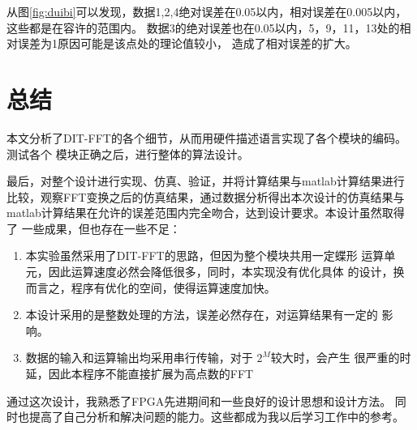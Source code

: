 从图\ref{fig:duibi}可以发现，数据1,2,4绝对误差在0.05以内，相对误差在0.005以内，这些都是在容许的范围内。
数据3的绝对误差也在0.05以内，5，9，11，13处的相对误差为1原因可能是该点处的理论值较小，
造成了相对误差的扩大。

\chapter{总结}

本文分析了DIT-FFT的各个细节，从而用硬件描述语言实现了各个模块的编码。测试各个
模块正确之后，进行整体的算法设计。

最后，对整个设计进行实现、仿真、验证，并将计算结果与matlab计算结果进行
比较，观察FFT变换之后的仿真结果，通过数据分析得出本次设计的仿真结果与
matlab计算结果在允许的误差范围内完全吻合，达到设计要求。本设计虽然取得了
一些成果，但也存在一些不足：
\begin{enumerate}
    \item 本实验虽然采用了DIT-FFT的思路，但因为整个模块共用一定蝶形
        运算单元，因此运算速度必然会降低很多，同时，本实现没有优化具体
        的设计，换而言之，程序有优化的空间，使得运算速度加快。
    \item 本设计采用的是整数处理的方法，误差必然存在，对运算结果有一定的
        影响。
    \item 数据的输入和运算输出均采用串行传输，对于 $2^M$较大时，会产生
        很严重的时延，因此本程序不能直接扩展为高点数的FFT
\end{enumerate}

通过这次设计，我熟悉了FPGA先进期间和一些良好的设计思想和设计方法。
同时也提高了自己分析和解决问题的能力。这些都成为我以后学习工作中的参考。

